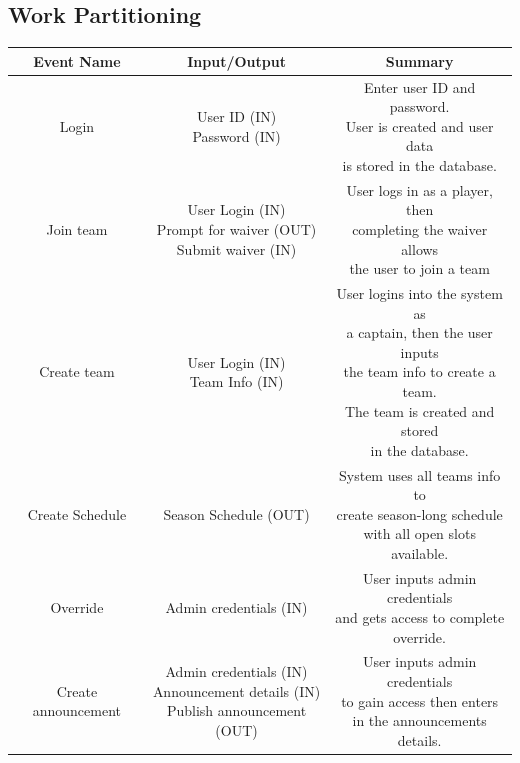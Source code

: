 \documentclass[12pt]{article}
\begin{document}
\subsection{Work Partitioning}
\begin{center}
    \begin{tabular}{ |c|c|c| }
        \hline
        \textbf{Event Name}  & \textbf{Input/Output} & \textbf{Summary} \\
        \hline
        Login & \makecell{User ID (IN) \\ Password (IN)}
		& \makecell{Enter user ID and password.
		\\User is created and user data
		\\is stored in the database.} \\
        \hline
		Join team & \makecell{User Login (IN) \\ Prompt for waiver (OUT) \\ Submit waiver (IN)}
		& \makecell{User logs in as a player, then
		\\completing the waiver allows
		\\the user to join a team} \\
		\hline
        Create team & \makecell{User Login (IN) \\ Team Info (IN)}
		& \makecell{User logins into the system as
		\\a captain, then the user inputs
		\\the team info to create a team.
		\\The team is created and stored
		\\in the database.} \\
		\hline
        Create Schedule & Season Schedule (OUT)
		& \makecell{System uses all teams info to
		\\create season-long schedule
		\\with all open slots available.} \\
		\hline
        Override & Admin credentials (IN)
		& \makecell{User inputs admin credentials
		\\and gets access to complete
		\\override.} \\
		\hline
        Create announcement & \makecell{Admin credentials (IN)
		\\Announcement details (IN) \\Publish announcement (OUT)}
		& \makecell{User inputs admin credentials
		\\to gain access then enters
		\\in the announcements details.
}
\end{tabular}
\end{center}
\end{document}
